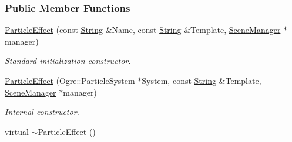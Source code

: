 \subsubsection*{Public Member Functions}
\begin{DoxyCompactItemize}
\item 
\hyperlink{classMezzanine_1_1ParticleEffect_abbc04839c173b33d1851b8061bd2b0f9}{ParticleEffect} (const \hyperlink{namespaceMezzanine_acf9fcc130e6ebf08e3d8491aebcf1c86}{String} \&Name, const \hyperlink{namespaceMezzanine_acf9fcc130e6ebf08e3d8491aebcf1c86}{String} \&Template, \hyperlink{classMezzanine_1_1SceneManager}{SceneManager} $\ast$manager)
\begin{DoxyCompactList}\small\item\em Standard initialization constructor. \item\end{DoxyCompactList}\item 
\hyperlink{classMezzanine_1_1ParticleEffect_a6ce060bf2f66ed82fb828ef01dcf2416}{ParticleEffect} (Ogre::ParticleSystem $\ast$System, const \hyperlink{namespaceMezzanine_acf9fcc130e6ebf08e3d8491aebcf1c86}{String} \&Template, \hyperlink{classMezzanine_1_1SceneManager}{SceneManager} $\ast$manager)
\begin{DoxyCompactList}\small\item\em Internal constructor. \item\end{DoxyCompactList}\item 
\hypertarget{classMezzanine_1_1ParticleEffect_add57951cee55189c780c4b5bb7cc752a}{
virtual \hyperlink{classMezzanine_1_1ParticleEffect_add57951cee55189c780c4b5bb7cc752a}{$\sim$ParticleEffect} ()}
\label{classMezzanine_1_1ParticleEffect_add57951cee55189c780c4b5bb7cc752a}


\end{DoxyCompactItemize}
